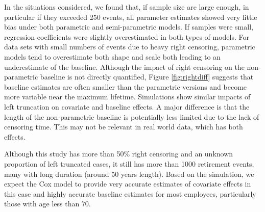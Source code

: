 \documentclass[12pt,letterpaper]{article}
\begin{document}
In the situations considered, we found that, if sample size are large enough, in particular if they exceeded 250 events, all parameter estimates showed very little bias under both parametric and semi-parametric models.  If samples were small, regression coefficients were slightly overestimated in both types of models.  For data sets with small numbers of events due to heavy right censoring, parametric models tend to overestimate both shape and scale both leading to an underestimate of the baseline.  Although the impact of right censoring on the non-parametric baseline is not directly quantified, Figure \ref{fig:rightdiff} suggests that baseline estimates are often smaller than the parametric versions and become more variable near the maximum lifetime.  Simulations show similar impacts of left truncation on covariate and baseline effects.  A major difference is that the length of the non-parametric baseline is potentially less limited due to the lack of censoring time.  This may not be relevant in real world data, which has both effects.

Although this study has more than 50\% right censoring and an unknown proportion of left truncated cases, it still has more than 1000 retirement events, many with long duration (around 50 years length). Based on the simulation, we expect the Cox model to provide very accurate estimates of covariate effects in this case and highly accurate baseline estimates for most employees, particularly those with age less than 70.

%
\end{document}
